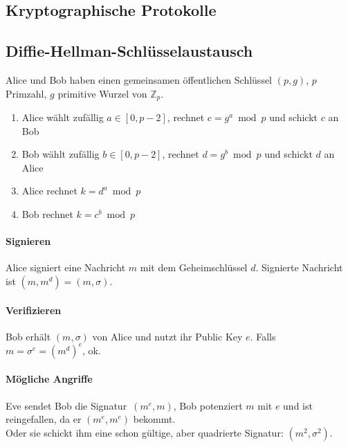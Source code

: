 \documentclass[8pt,a4paper,landscape]{article}
\begin{document}
\begin{multicols}{4}
\section{Kryptographische Protokolle}
\subsection{Diffie-Hellman-Schlüsselaustausch}
Alice und Bob haben einen gemeinsamen öffentlichen Schlüssel $(p,g)$, 
$p$ Primzahl, $g$ primitive Wurzel von $\mathbb{Z}_{p}$.
\begin{enumerate}
    \item Alice wählt zufällig $a \in [0,p-2]$, rechnet 
          $c = g^a \bmod p$ und schickt $c$ an Bob
    \item Bob wählt zufällig $b \in [0,p-2]$, rechnet
          $d = g^b  \bmod p$ und schickt $d$ an Alice
    \item Alice rechnet $k = d^a \bmod p$
    \item Bob rechnet $k = c^b \bmod p$
\end{enumerate}

\paragraph{Signieren}
Alice signiert eine Nachricht $m$ mit dem Geheimschlüssel $d$. Signierte
Nachricht ist $(m, m^{d}) = (m, \sigma)$.
\paragraph{Verifizieren} Bob erhält $(m, \sigma)$ von Alice und nutzt ihr Public Key $e$.
Falls $m = \sigma^{e} = (m^{d})^{e}$, ok.

\paragraph{Mögliche Angriffe} Eve sendet Bob die \glqq Signatur\grqq\ $(m^{e}, m)$, Bob potenziert $m$ mit $e$ und ist reingefallen, da er $(m^{e}, m^{e})$ bekommt. \\
Oder sie schickt ihm eine schon gültige, aber quadrierte Signatur: $(m^2, \sigma^2)$.
\end{multicols}
\end{document}

